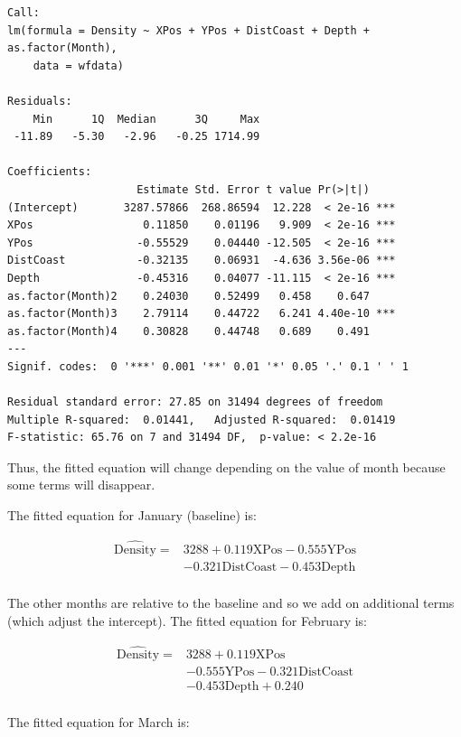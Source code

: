 \documentclass[
  oneside]{krantz}
\begin{document}
\begin{verbatim}
Call:
lm(formula = Density ~ XPos + YPos + DistCoast + Depth + as.factor(Month), 
    data = wfdata)

Residuals:
    Min      1Q  Median      3Q     Max 
 -11.89   -5.30   -2.96   -0.25 1714.99 

Coefficients:
                    Estimate Std. Error t value Pr(>|t|)    
(Intercept)       3287.57866  268.86594  12.228  < 2e-16 ***
XPos                 0.11850    0.01196   9.909  < 2e-16 ***
YPos                -0.55529    0.04440 -12.505  < 2e-16 ***
DistCoast           -0.32135    0.06931  -4.636 3.56e-06 ***
Depth               -0.45316    0.04077 -11.115  < 2e-16 ***
as.factor(Month)2    0.24030    0.52499   0.458    0.647    
as.factor(Month)3    2.79114    0.44722   6.241 4.40e-10 ***
as.factor(Month)4    0.30828    0.44748   0.689    0.491    
---
Signif. codes:  0 '***' 0.001 '**' 0.01 '*' 0.05 '.' 0.1 ' ' 1

Residual standard error: 27.85 on 31494 degrees of freedom
Multiple R-squared:  0.01441,   Adjusted R-squared:  0.01419 
F-statistic: 65.76 on 7 and 31494 DF,  p-value: < 2.2e-16
\end{verbatim}

\normalsize

Thus, the fitted equation will change depending on the value of month because some terms will disappear.

The fitted equation for January (baseline) is:

\begin{align}
\widehat{\textrm{Density}} = & 3288 + 0.119\textrm{XPos} -0.555\textrm{YPos} \\
& - 0.321\textrm{DistCoast} - 0.453 \textrm{Depth}\\
\end{align}

The other months are relative to the baseline and so we add on additional terms (which adjust the intercept). The fitted equation for February is:

\begin{align}
\widehat{\textrm{Density}} = & 3288 + 0.119\textrm{XPos} \\
& -0.555\textrm{YPos} - 0.321\textrm{DistCoast} \\
& - 0.453 \textrm{Depth} + 0.240\\
\end{align}

The fitted equation for March is:
\end{document}
